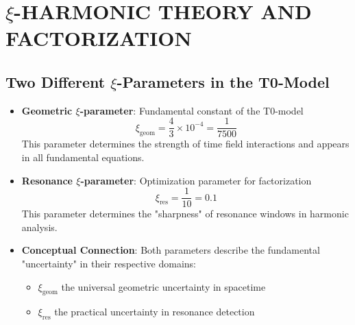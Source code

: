 \documentclass[12pt,a4paper]{article}
\begin{document}
	\section{$\xi$-HARMONIC THEORY AND FACTORIZATION}
	
	\subsection{Two Different $\xi$-Parameters in the T0-Model}
	\begin{itemize}
		\item \textbf{Geometric $\xi$-parameter}: Fundamental constant of the T0-model
		\begin{equation}
			\xi_{\text{geom}} = \frac{4}{3} \times 10^{-4} = \frac{1}{7500}
		\end{equation}
		This parameter determines the strength of time field interactions and appears in all fundamental equations.
		
		\item \textbf{Resonance $\xi$-parameter}: Optimization parameter for factorization
		\begin{equation}
			\xi_{\text{res}} = \frac{1}{10} = 0.1
		\end{equation}
		This parameter determines the "sharpness" of resonance windows in harmonic analysis.
		
		\item \textbf{Conceptual Connection}: Both parameters describe the fundamental "uncertainty" in their respective domains:
		\begin{itemize}
			\item $\xi_{\text{geom}}$ the universal geometric uncertainty in spacetime
			\item $\xi_{\text{res}}$ the practical uncertainty in resonance detection
		\end{itemize}
	\end{itemize}
	
\end{document}
